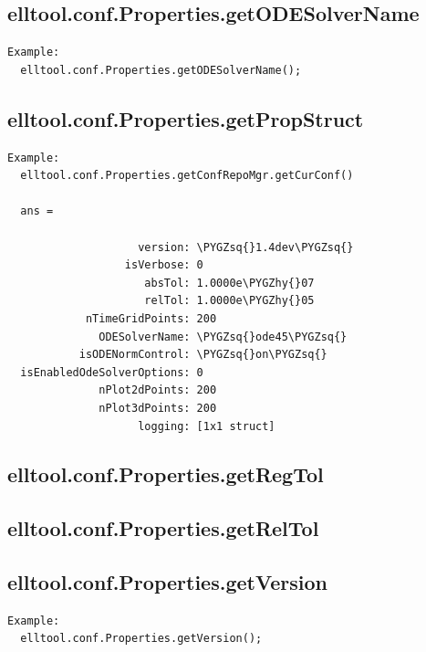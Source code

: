 \documentclass[letterpaper,10pt,english]{sphinxmanual}
\def\PYGZhy{\char`\-}
\def\PYGZsq{\char`\'}
\begin{document}
\subsection{elltool.conf.Properties.getODESolverName}
\label{chap_functions:elltool-conf-properties-getodesolvername}
\begin{Verbatim}[commandchars=\\\{\}]
Example:
  elltool.conf.Properties.getODESolverName();
\end{Verbatim}


\subsection{elltool.conf.Properties.getPropStruct}
\label{chap_functions:elltool-conf-properties-getpropstruct}
\begin{Verbatim}[commandchars=\\\{\}]
Example:
  elltool.conf.Properties.getConfRepoMgr.getCurConf()

  ans =

                    version: \PYGZsq{}1.4dev\PYGZsq{}
                  isVerbose: 0
                     absTol: 1.0000e\PYGZhy{}07
                     relTol: 1.0000e\PYGZhy{}05
            nTimeGridPoints: 200
              ODESolverName: \PYGZsq{}ode45\PYGZsq{}
           isODENormControl: \PYGZsq{}on\PYGZsq{}
  isEnabledOdeSolverOptions: 0
              nPlot2dPoints: 200
              nPlot3dPoints: 200
                    logging: [1x1 struct]
\end{Verbatim}


\subsection{elltool.conf.Properties.getRegTol}
\label{chap_functions:elltool-conf-properties-getregtol}

\subsection{elltool.conf.Properties.getRelTol}
\label{chap_functions:elltool-conf-properties-getreltol}

\subsection{elltool.conf.Properties.getVersion}
\label{chap_functions:elltool-conf-properties-getversion}
\begin{Verbatim}[commandchars=\\\{\}]
Example:
  elltool.conf.Properties.getVersion();
\end{Verbatim}
\end{document}
